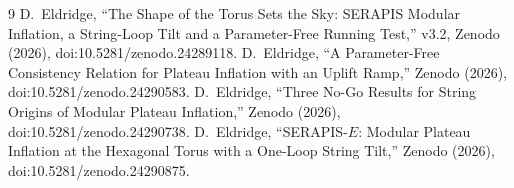 \documentclass[aps,prd,twocolumn,superscriptaddress,nofootinbib,showkeys]{revtex4-2}
\begin{document}
\begin{thebibliography}{9}
 D.~Eldridge, ``The Shape of the Torus Sets the Sky: SERAPIS Modular Inflation, a String-Loop Tilt and a Parameter-Free Running Test,'' v3.2, Zenodo (2026), doi:10.5281/zenodo.24289118.
 D.~Eldridge, ``A Parameter-Free Consistency Relation for Plateau Inflation with an Uplift Ramp,'' Zenodo (2026), doi:10.5281/zenodo.24290583.
 D.~Eldridge, ``Three No-Go Results for String Origins of Modular Plateau Inflation,'' Zenodo (2026), doi:10.5281/zenodo.24290738.
 D.~Eldridge, ``SERAPIS-$E$: Modular Plateau Inflation at the Hexagonal Torus with a One-Loop String Tilt,'' Zenodo (2026), doi:10.5281/zenodo.24290875.
\end{thebibliography}
\end{document}
